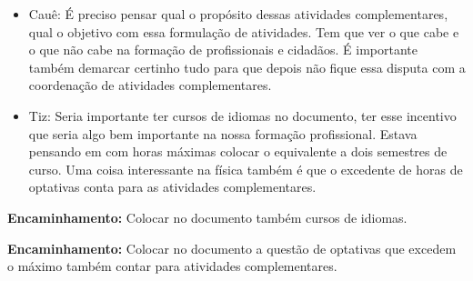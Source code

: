 \documentclass{ata-calico}
\begin{document}
\begin{itemize}
\item Cauê: É preciso pensar qual o propósito dessas atividades complementares, qual o objetivo com essa formulação de atividades. Tem que ver o que cabe e o que não cabe na formação de profissionais e cidadãos. É importante também demarcar certinho tudo para que depois não fique essa disputa com a coordenação de atividades complementares.
\item Tiz: Seria importante ter cursos de idiomas no documento, ter esse incentivo que seria algo bem importante na nossa formação profissional. Estava pensando em com horas máximas colocar o equivalente a dois semestres de curso. Uma coisa interessante na física também é que o excedente de horas de optativas conta para as atividades complementares.
\end{itemize}

\textbf{Encaminhamento:} Colocar no documento também cursos de idiomas.

\textbf{Encaminhamento:} Colocar no documento a questão de optativas que excedem o máximo também contar para atividades complementares.
\end{document}
